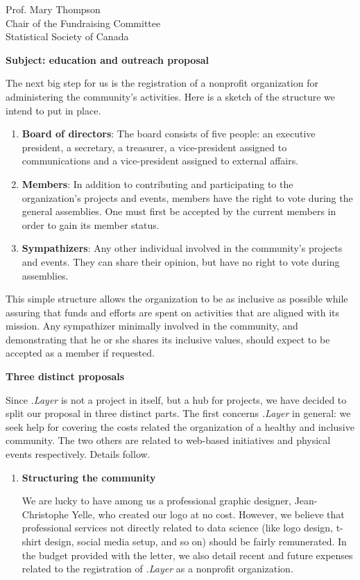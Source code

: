 \documentclass[11pt, a4paper]{letter} %
\begin{document}
\begin{letter}{
	Prof. Mary Thompson\\
	Chair of the Fundraising Committee\\
	Statistical Society of Canada
	
	\bigskip
	\textbf{Subject: education and outreach proposal}%
}
The next big step for us is the registration of a nonprofit organization for administering the community's activities. Here is a sketch of the structure we intend to put in place.

\begin{enumerate}
	\item[] \textbf{Board of directors}: The board consists of five people: an executive president, a secretary, a treasurer, a vice-president assigned to communications and a vice-president assigned to external affairs.
	\item[] \textbf{Members}: In addition to contributing and participating to the organization's projects and events, members have the right to vote during the general assemblies. One must first be accepted by the current members in order to gain its member status.
	\item[] \textbf{Sympathizers}: Any other individual involved in the community's projects and events. They can share their opinion, but have no right to vote during assemblies.
\end{enumerate}

This simple structure allows the organization to be as inclusive as possible while assuring that funds and efforts are spent on activities that are aligned with its mission. Any sympathizer minimally involved in the community, and demonstrating that he or she shares its inclusive values, should expect to be accepted as a member if requested.

\pagebreak

\noindent \textbf{Three distinct proposals}

Since \emph{.Layer} is not a project in itself, but a hub for projects, we have decided to split our proposal in three distinct parts. The first concerns \emph{.Layer} in general: we seek help for covering the costs related the organization of a healthy and inclusive community. The two others are related to web-based initiatives and physical events respectively. Details follow.

\begin{enumerate}
	\item \textbf{Structuring the community}
	
	\quad We are lucky to have among us a professional graphic designer, Jean-Christophe Yelle, who created our logo at no cost. However, we believe that professional services not directly related to data science (like logo design, t-shirt design, social media setup, and so on) should be fairly remunerated. In the budget provided with the letter, we also detail recent and future expenses related to the registration of \emph{.Layer} as a nonprofit organization.
	

\end{enumerate}
\end{letter}
\end{document}
